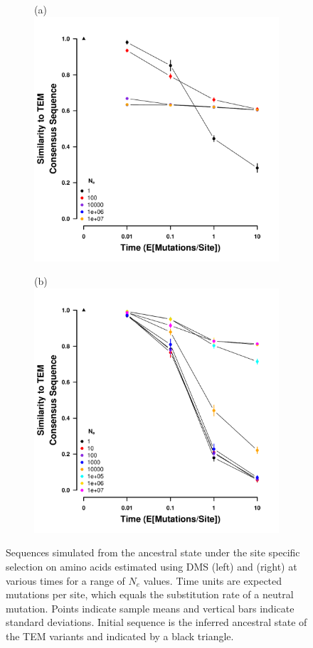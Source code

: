 \documentclass[12pt]{article}
\begin{document}
\begin{figure}
    \centering
    \begin{subfigure}
        \centering
       (a)\includegraphics[width=.45\textwidth]{img/simulated_dist_time_DMS_ancest.pdf}
    \end{subfigure}
    \begin{subfigure}
        \centering
        (b)\includegraphics[width=.45\textwidth]{img/simulated_dist_time_SELAC_ancest.pdf}
    \end{subfigure}
    \caption{Sequences simulated from the ancestral state under the site specific selection on amino acids estimated using DMS (left) and \selac (right) at various times for a range of $N_e$ values.
    Time units are expected mutations per site, which equals the substitution rate of a neutral mutation.
    Points indicate sample means and vertical bars indicate standard deviations. Initial sequence is the inferred ancestral state of the TEM variants and indicated by a black triangle.}
    \label{fig:dis_sim}
\end{figure}

\clearpage
\end{document}
